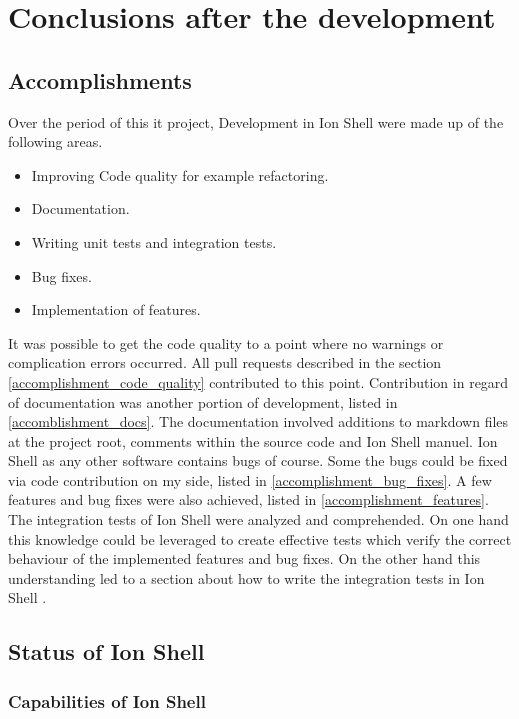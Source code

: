 \chapter{Conclusions after the development}

\section{Accomplishments}

Over the period of this it project, Development in Ion Shell were made up of the following areas.

\begin{itemize}
	\item Improving Code quality for example refactoring.
	\item Documentation.
	\item Writing unit tests and integration tests.
	\item Bug fixes.
	\item Implementation of features.
\end{itemize}

It was possible to get the code quality to a point where no warnings or complication errors occurred.
All pull requests described in the section \ref{accomplishment_code_quality} contributed to this point.
Contribution in regard of documentation was another portion of development,
listed in \ref{accomblishment_docs}.
The documentation involved additions to markdown files at the project root, comments within the source code and
Ion Shell manuel. Ion Shell as any other software contains bugs of course. Some the bugs could be fixed via code contribution on my side, listed in \ref{accomplishment_bug_fixes}.
A few features and bug fixes were also achieved, listed in \ref{accomplishment_features}.
The integration tests of Ion Shell were analyzed and comprehended.
On one hand this knowledge could be leveraged to create effective tests
which verify the correct behaviour of the implemented features and bug fixes.
On the other hand this understanding led to a section about
how to write the integration tests in Ion Shell \cite{pr_docs_how_to_integration_test}.

\section{Status of Ion Shell}

\subsection{Capabilities of Ion Shell}

